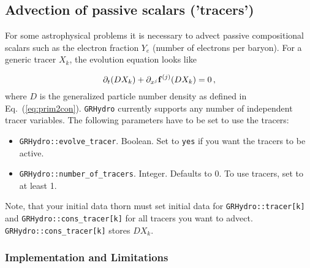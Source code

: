 \documentclass{article}
\begin{document}
\subsection{Advection of passive scalars ('tracers')}
\label{sec:tracer}

For some astrophysical problems it is necessary to advect passive
compositional scalars such as the electron fraction $Y_e$ (number of
electrons per baryon). For a generic tracer $X_k$, the evolution
equation looks like


\begin{equation}
  \label{eq:tracer}
  \partial_t { ( D X_k )} + \partial_{x^j} {\bf f}^{(j)} ({D X_k}) = 0\, ,
\end{equation}
where $D$ is the generalized particle number density as defined in
Eq.~(\ref{eq:prim2con}). {\tt GRHydro} currently supports any number of
independent tracer variables. The following parameters have to be
set to use the tracers:

\begin{itemize}
  \item {\tt GRHydro::evolve\_tracer}. Boolean. Set to {\tt yes} if
    you want the tracers to be active.
  \item {\tt GRHydro::number\_of\_tracers}. Integer. Defaults to 0. To
    use tracers, set to at least 1.
\end{itemize}

Note, that your initial data thorn must set initial data for
{\tt GRHydro::tracer[k]} and {\tt GRHydro::cons\_tracer[k]} for all tracers
you want to advect. {\tt GRHydro::cons\_tracer[k]} stores $D X_k$.

\subsubsection{Implementation and Limitations}
\end{document}
